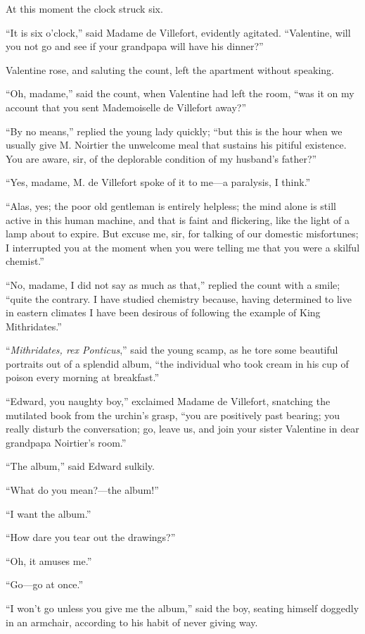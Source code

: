 At this moment the clock struck six.

“It is six o’clock,” said Madame de Villefort, evidently agitated.
“Valentine, will you not go and see if your grandpapa will have his
dinner?”

Valentine rose, and saluting the count, left the apartment without
speaking.

“Oh, madame,” said the count, when Valentine had left the room, “was it
on my account that you sent Mademoiselle de Villefort away?”

“By no means,” replied the young lady quickly; “but this is the hour
when we usually give M. Noirtier the unwelcome meal that sustains his
pitiful existence. You are aware, sir, of the deplorable condition of
my husband’s father?”

“Yes, madame, M. de Villefort spoke of it to me—a paralysis, I think.”

“Alas, yes; the poor old gentleman is entirely helpless; the mind alone
is still active in this human machine, and that is faint and
flickering, like the light of a lamp about to expire. But excuse me,
sir, for talking of our domestic misfortunes; I interrupted you at the
moment when you were telling me that you were a skilful chemist.”

“No, madame, I did not say as much as that,” replied the count with a
smile; “quite the contrary. I have studied chemistry because, having
determined to live in eastern climates I have been desirous of
following the example of King Mithridates.”

“\textit{Mithridates, rex Ponticus},” said the young scamp, as he tore some
beautiful portraits out of a splendid album, “the individual who took
cream in his cup of poison every morning at breakfast.”

“Edward, you naughty boy,” exclaimed Madame de Villefort, snatching the
mutilated book from the urchin’s grasp, “you are positively past
bearing; you really disturb the conversation; go, leave us, and join
your sister Valentine in dear grandpapa Noirtier’s room.”

“The album,” said Edward sulkily.

“What do you mean?—the album!”

“I want the album.”

“How dare you tear out the drawings?”

“Oh, it amuses me.”

“Go—go at once.”

“I won’t go unless you give me the album,” said the boy, seating
himself doggedly in an armchair, according to his habit of never giving
way.

